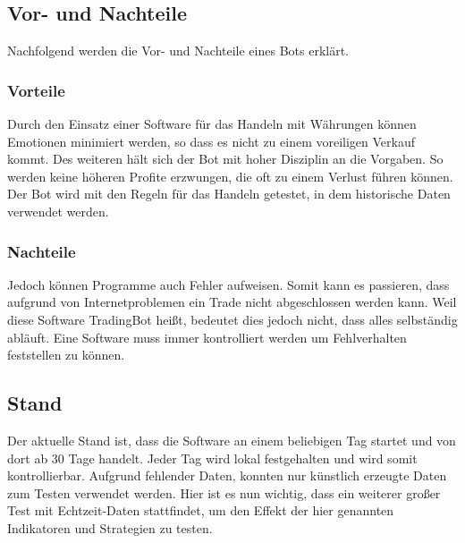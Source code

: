 \subsection{Vor- und Nachteile}
Nachfolgend werden die Vor- und Nachteile eines Bots erklärt.
\subsubsection{Vorteile}
Durch den Einsatz einer Software für das Handeln mit Währungen können Emotionen minimiert werden, so dass es nicht zu einem voreiligen Verkauf kommt. Des weiteren hält sich der Bot mit hoher Disziplin an die Vorgaben. So werden keine höheren Profite erzwungen, die oft zu einem Verlust führen können. Der Bot wird mit den Regeln für das Handeln getestet, in dem historische Daten verwendet werden.
\subsubsection{Nachteile}
Jedoch können Programme auch Fehler aufweisen. Somit kann es passieren, dass aufgrund von Internetproblemen ein Trade nicht abgeschlossen werden kann. Weil diese Software TradingBot heißt, bedeutet dies jedoch nicht, dass alles selbständig abläuft. Eine Software muss immer kontrolliert werden um Fehlverhalten feststellen zu können.

\subsection{Stand}
Der aktuelle Stand ist, dass die Software an einem beliebigen Tag startet und von dort ab 30 Tage handelt. Jeder Tag wird lokal festgehalten und wird somit kontrollierbar. Aufgrund fehlender Daten, konnten nur künstlich erzeugte Daten zum Testen verwendet werden. Hier ist es nun wichtig, dass ein weiterer großer Test mit Echtzeit-Daten stattfindet, um den Effekt der hier genannten Indikatoren und Strategien zu testen. 
